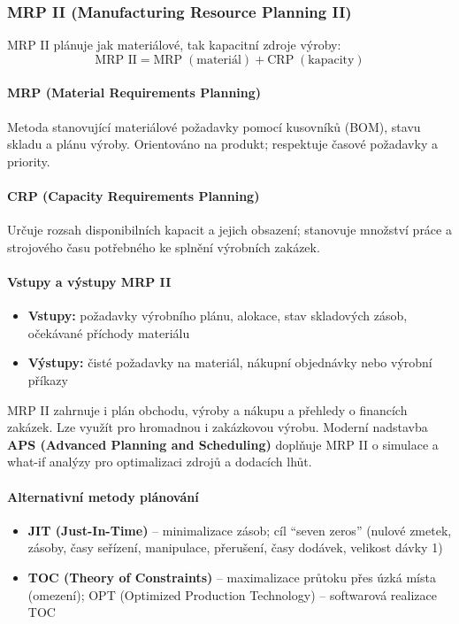 \subsubsection{MRP II (Manufacturing Resource Planning II)}

MRP II plánuje jak materiálové, tak kapacitní zdroje výroby:
\[
  \text{MRP II} = \text{MRP} \;(\text{materiál}) + \text{CRP} \;(\text{kapacity})
\]

\paragraph{MRP (Material Requirements Planning)}
Metoda stanovující materiálové požadavky pomocí kusovníků (BOM), stavu skladu a plánu výroby.
Orientováno na produkt; respektuje časové požadavky a priority.

\paragraph{CRP (Capacity Requirements Planning)}
Určuje rozsah disponibilních kapacit a jejich obsazení; stanovuje množství práce a strojového
času potřebného ke splnění výrobních zakázek.

\paragraph{Vstupy a výstupy MRP II}
\begin{itemize}
  \item \textbf{Vstupy:} požadavky výrobního plánu, alokace, stav skladových zásob,
    očekávané příchody materiálu
  \item \textbf{Výstupy:} čisté požadavky na materiál, nákupní objednávky nebo výrobní příkazy
\end{itemize}

MRP II zahrnuje i plán obchodu, výroby a nákupu a přehledy o financích zakázek.
Lze využít pro hromadnou i zakázkovou výrobu.
Moderní nadstavba \textbf{APS (Advanced Planning and Scheduling)} doplňuje MRP II
o simulace a what-if analýzy pro optimalizaci zdrojů a dodacích lhůt.

\paragraph{Alternativní metody plánování}
\begin{itemize}
  \item \textbf{JIT (Just-In-Time)} -- minimalizace zásob; cíl ``seven zeros'' (nulové zmetek,
    zásoby, časy seřízení, manipulace, přerušení, časy dodávek, velikost dávky 1)
  \item \textbf{TOC (Theory of Constraints)} -- maximalizace průtoku přes úzká místa (omezení);
    OPT (Optimized Production Technology) -- softwarová realizace TOC
\end{itemize}

